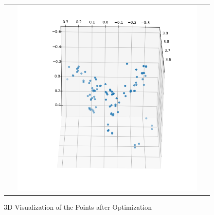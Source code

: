\documentclass[a4paper]{article}
\begin{document}
\begin{figure}[!ht]
\centering
\begin{tabular}{c}
{\includegraphics[width=0.9\textwidth]{images/ba1.png}}
\end{tabular}
\caption{3D Visualization of the Points after Optimization}
\end{figure}
\end{document}
